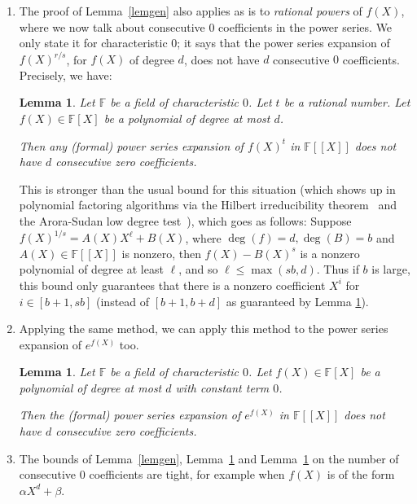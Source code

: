 \documentclass{article}
\newtheorem{lemma}[theorem]{Lemma}
\newcommand{\F}{\mathbb{F}}
\begin{document}
\begin{enumerate}
 In this generality, the bound of $\frac{2m}{3}$ is tight.
 If $m$ is divisible by $3$, then the polynomial $f(X) = \left(X^{2m/3} + X^{m/3} - \frac{1}{2}\right)$ is such that $f(x)^2 = \frac{9}{4}$ for all $x \in G$ (since $x^{m/3}$ is a cube root of $1$). 
  
 
 \item The proof of Lemma~\ref{lemgen} also applies as is to {\em rational powers} of $f(X)$, where we now talk about consecutive 0 coefficients in the power series. We only state it for characteristic $0$; it says that the power series expansion of $f(X)^{r/s}$, for $f(X)$ of degree $d$, does not have $d$ consecutive $0$ coefficients. Precisely, we have:
  
\begin{lemma}
\label{lemgen2}
Let $\F$ be a field of characteristic $0$. 
Let $t$ be a rational number.
Let $f(X) \in \F[X]$ be a polynomial of degree at most $d$.

Then any (formal) power series expansion of $f(X)^t$ in $\F[[X]]$ does not have
$d$ consecutive zero coefficients.
\end{lemma}



This is stronger than the usual bound for this situation
(which shows up in polynomial factoring algorithms via the Hilbert irreducibility theorem~\cite{KaltofenHIT} and the Arora-Sudan low degree test~\cite{ASlowdegree}), 
which goes as follows:
Suppose $f(X)^{1/s} =  A(X) X^\ell + B(X)$, where $\deg(f) = d, \deg(B) = b$ and $A(X) \in \F[[X]]$ is nonzero, then $f(X) - B(X)^s$ is a nonzero polynomial of degree at least $\ell$, and so $\ell \leq \max(sb, d)$. Thus
if $b$ is large, this bound only guarantees that there is a nonzero coefficient 
$X^i$ for $i \in [b+1, sb]$  (instead of $[b+1, b+d]$ as guaranteed by Lemma \ref{lemgen2}).

\item Applying the same method, we can apply this method to the power series expansion of $e^{f(X)}$ too.

\begin{lemma}
\label{lemgen3}
Let $\F$ be a field of characteristic $0$. 
Let $f(X) \in \F[X]$ be a polynomial of degree at most $d$ with constant term $0$.

Then the (formal) power series expansion of $e^{f(X)}$ in $\F[[X]]$ does not have $d$ consecutive zero coefficients.
\end{lemma}
 
 \item The bounds of Lemma~\ref{lemgen}, Lemma~\ref{lemgen2} and Lemma~\ref{lemgen3} on the number of consecutive $0$ coefficients are tight, for example when $f(X)$ is of the form $\alpha X^d + \beta$.
 

\end{enumerate}
\end{document}
